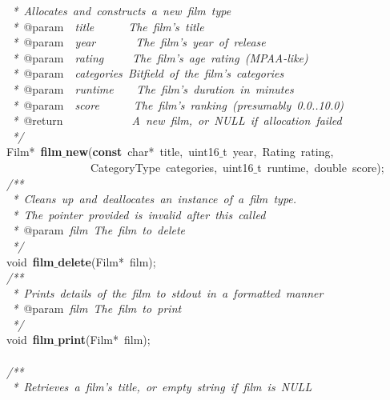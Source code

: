 \documentclass{article}
\begin{document}
\mbox{}\textit{\ *\ Allocates\ and\ constructs\ a\ new\ film\ type} \\
\mbox{}\textit{\ *\ }@param\textit{\ \ title\ \ \ \ \ \ The\ film's\ title} \\
\mbox{}\textit{\ *\ }@param\textit{\ \ year\ \ \ \ \ \ \ The\ film's\ year\ of\ release} \\
\mbox{}\textit{\ *\ }@param\textit{\ \ rating\ \ \ \ \ The\ film's\ age\ rating\ (MPAA-like)} \\
\mbox{}\textit{\ *\ }@param\textit{\ \ categories\ Bitfield\ of\ the\ film's\ categories} \\
\mbox{}\textit{\ *\ }@param\textit{\ \ runtime\ \ \ \ The\ film's\ duration\ in\ minutes} \\
\mbox{}\textit{\ *\ }@param\textit{\ \ score\ \ \ \ \ \ The\ film's\ ranking\ (presumably\ 0.0..10.0)} \\
\mbox{}\textit{\ *\ }@return\textit{\ \ \ \ \ \ \ \ \ \ \ \ A\ new\ film,\ or\ NULL\ if\ allocation\ failed} \\
\mbox{}\textit{\ */} \\
\mbox{}Film*\ \textbf{film$\_$new}(\textbf{const}\ char*\ title,\ uint16$\_$t\ year,\ Rating\ rating, \\
\mbox{}\ \ \ \ \ \ \ \ \ \ \ \ \ \ \ CategoryType\ categories,\ uint16$\_$t\ runtime,\ double\ score); \\
\mbox{}\textit{/**} \\
\mbox{}\textit{\ *\ Cleans\ up\ and\ deallocates\ an\ instance\ of\ a\ film\ type.} \\
\mbox{}\textit{\ *\ The\ pointer\ provided\ is\ invalid\ after\ this\ called} \\
\mbox{}\textit{\ *\ }@param\textit{\ film\ The\ film\ to\ delete} \\
\mbox{}\textit{\ */} \\
\mbox{}void\ \textbf{film$\_$delete}(Film*\ film); \\
\mbox{}\textit{/**} \\
\mbox{}\textit{\ *\ Prints\ details\ of\ the\ film\ to\ stdout\ in\ a\ formatted\ manner} \\
\mbox{}\textit{\ *\ }@param\textit{\ film\ The\ film\ to\ print} \\
\mbox{}\textit{\ */} \\
\mbox{}void\ \textbf{film$\_$print}(Film*\ film); \\
\mbox{} \\
\mbox{}\textit{/**} \\
\mbox{}\textit{\ *\ Retrieves\ a\ film's\ title,\ or\ empty\ string\ if\ film\ is\ NULL} \\
\end{document}
